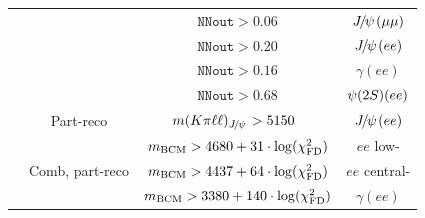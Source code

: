 \begin{table}[ht!]
\begin{center}
\begin{footnotesize}
\begin{tabular}{c|c|c|c}
\cline{3-4}
	& 					& $\texttt{NNout} > 0.06$ & $\jpsi(\mu\mu)$ \\
	&					& $\texttt{NNout} > 0.20$ & $\jpsi(ee)$\\
\cline{3-4}
	&					& $\texttt{NNout} > 0.16$ & $\gamma(ee)$ \\
	&					& $\texttt{NNout} > 0.68$ & $\psitwos(ee)$ \\
\cline{2-4}
	& Part-reco					& $m(K\pi\ell\ell)_\jpsi	> 5150$~\mevcc		& $\jpsi(ee)$	\\
\cline{2-4}
	& \multirow{3}{*}{Comb, part-reco}	& $m_{\rm BCM} > 4680 + 31 \cdot \log(\chi^2_{\rm FD})$ & $ee$ low- \\
	&							& $m_{\rm BCM} > 4437 + 64 \cdot \log(\chi^2_{\rm FD})$ & $ee$ central- \\
\cline{3-4}	
	&							& $m_{\rm BCM} > 3380 + 140 \cdot \log(\chi^2_{\rm FD})$ & $\gamma(ee)$ \\
\end{tabular}
\end{footnotesize}
\end{center}
\end{table}



